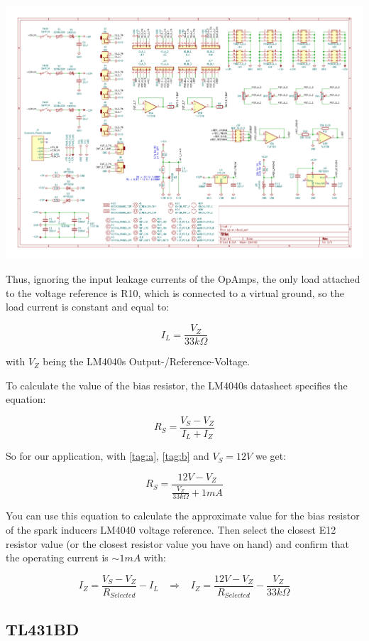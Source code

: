 \documentclass[12pt, a4paper]{article}
\begin{document}
\includegraphics[width=\textwidth, trim = 16.7cm 8.9cm 1.5cm 9.1cm, clip=true]{pdf/schematic.pdf}

Thus, ignoring the input leakage currents of the OpAmps, the only load attached to the voltage
reference is R10, which is connected to a virtual ground, so the load current is constant and
equal to:

\[ I_L = \frac{V_Z}{33k\Omega} \tag*{$(b)$}\label{tag:b} \]

with $V_Z$ being the LM4040s Output-/Reference-Voltage.

To calculate the value of the bias resistor, the LM4040s datasheet specifies the equation:

\[ R_S = \frac{V_S - V_Z}{I_L + I_Z} \tag*{$(1)$} \]

So for our application, with \ref{tag:a}, \ref{tag:b} and $V_S = 12V$ we get:

\[ R_S = \frac{12V - V_Z}{\frac{V_Z}{33k \Omega} + 1mA} \tag*{$(2)$} \]

You can use this equation to calculate the approximate value for the bias resistor of the
spark inducers LM4040 voltage reference. Then select the closest E12 resistor value
(or the closest resistor value you have on hand) and confirm that the operating current is
\enspace $\sim 1mA$ \enspace with:

\[
    I_Z = \frac{V_S - V_Z}{R_{Selected}} - I_L \;\;\; \Rightarrow \;\;\;
    I_Z = \frac{12V - V_Z}{R_{Selected}} - \frac{V_Z}{33k \Omega} \tag*{$(3)$}
\]

\subsection*{TL431BD}
\end{document}
